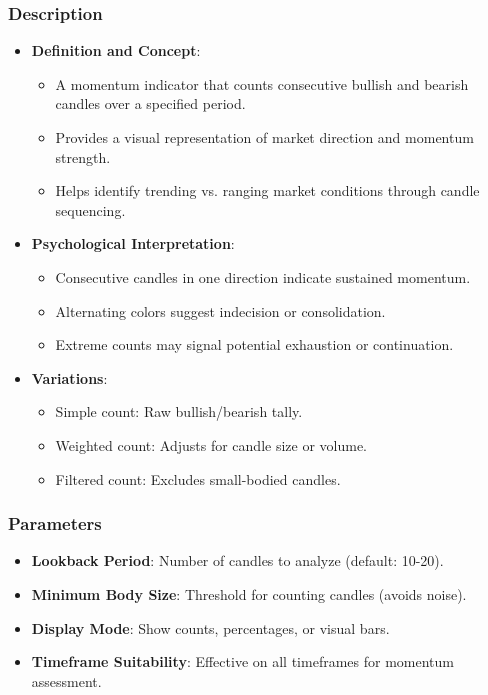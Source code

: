 \documentclass[12pt]{article}
\begin{document}
\subsubsection{Description}
\begin{itemize}
\item \textbf{Definition and Concept}:
  \begin{itemize}
  \item A momentum indicator that counts consecutive bullish and bearish candles over a specified period.
  \item Provides a visual representation of market direction and momentum strength.
  \item Helps identify trending vs. ranging market conditions through candle sequencing.
  \end{itemize}
\item \textbf{Psychological Interpretation}:
  \begin{itemize}
  \item Consecutive candles in one direction indicate sustained momentum.
  \item Alternating colors suggest indecision or consolidation.
  \item Extreme counts may signal potential exhaustion or continuation.
  \end{itemize}
\item \textbf{Variations}:
  \begin{itemize}
  \item Simple count: Raw bullish/bearish tally.
  \item Weighted count: Adjusts for candle size or volume.
  \item Filtered count: Excludes small-bodied candles.
  \end{itemize}
\end{itemize}

\subsubsection{Parameters}
\begin{itemize}
\item \textbf{Lookback Period}: Number of candles to analyze (default: 10-20).
\item \textbf{Minimum Body Size}: Threshold for counting candles (avoids noise).
\item \textbf{Display Mode}: Show counts, percentages, or visual bars.
\item \textbf{Timeframe Suitability}: Effective on all timeframes for momentum assessment.
\end{itemize}
\end{document}
